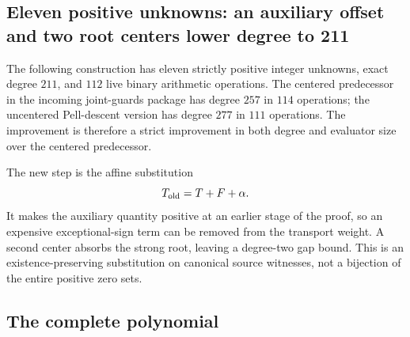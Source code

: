 \subsection{Eleven positive unknowns: an auxiliary offset and two root centers lower degree to 211}
\label{sec:positive-eleven-offset}

The following construction has eleven strictly positive integer unknowns,
exact degree $211$, and $112$ live binary arithmetic operations. The
centered predecessor in the incoming joint-guards package has degree $257$
in $114$ operations; the uncentered Pell-descent version has degree
$277$ in $111$ operations. The improvement is therefore a strict improvement in both degree and evaluator size over the centered predecessor.

The new step is the affine substitution
\[
 T_{\rm old}=T+F+\alpha.
\]
It makes the auxiliary quantity positive at an earlier stage of the proof,
so an expensive exceptional-sign term can be removed from the transport
weight. A second center absorbs the strong root, leaving a degree-two
gap bound. This is an existence-preserving substitution on canonical source
witnesses, not a bijection of the entire positive zero sets.

\subsection{The complete polynomial}

